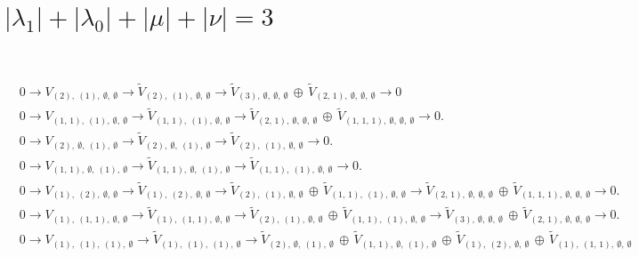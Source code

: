 \documentclass[openany, a4paper]{amsbook}
\theoremstyle{definition}
\numberwithin{equation}{chapter}
\begin{document}
$\quad$

\section{$ |\lambda_1| + |\lambda_0| + |\mu| + |\nu| = 3$}

$\quad$

\begin{align*} &
0 \to 
V_{ (2), \ (1), \ \emptyset, \ \emptyset }\to
\tilde{V}_{ (2), \ (1), \ \emptyset, \ \emptyset }
\to
\tilde{V}_{ (3), \ \emptyset, \ \emptyset, \ \emptyset }\,\oplus\,\tilde{V}_{ (2,\,1), \ \emptyset, \ \emptyset, \ \emptyset }
\to 0\\
&
0 \to 
V_{ (1,\,1), \ (1), \ \emptyset, \ \emptyset }\to
\tilde{V}_{ (1,\,1), \ (1), \ \emptyset, \ \emptyset }
\to
\tilde{V}_{ (2,\,1), \ \emptyset, \ \emptyset, \ \emptyset }\,\oplus\,\tilde{V}_{ (1,\,1,\,1), \ \emptyset, \ \emptyset, \ \emptyset }
\to 0.
\\ &
0 \to 
V_{ (2), \ \emptyset, \ (1), \ \emptyset }\to
\tilde{V}_{ (2), \ \emptyset, \ (1), \ \emptyset }
\to
\tilde{V}_{ (2), \ (1), \ \emptyset, \ \emptyset }
\to 0.
\\ &
0 \to 
V_{ (1,\,1), \ \emptyset, \ (1), \ \emptyset }\to
\tilde{V}_{ (1,\,1), \ \emptyset, \ (1), \ \emptyset }
\to
\tilde{V}_{ (1,\,1), \ (1), \ \emptyset, \ \emptyset }
\to 0.
\\ &
0 \to 
V_{ (1), \ (2), \ \emptyset, \ \emptyset }\to
\tilde{V}_{ (1), \ (2), \ \emptyset, \ \emptyset }
\to
\tilde{V}_{ (2), \ (1), \ \emptyset, \ \emptyset }\,\oplus\,\tilde{V}_{ (1,\,1), \ (1), \ \emptyset, \ \emptyset }
\to
\tilde{V}_{ (2,\,1), \ \emptyset, \ \emptyset, \ \emptyset }\,\oplus\,\tilde{V}_{ (1,\,1,\,1), \ \emptyset, \ \emptyset, \ \emptyset }
\to 0.
\\ &
0 \to 
V_{ (1), \ (1,\,1), \ \emptyset, \ \emptyset }\to
\tilde{V}_{ (1), \ (1,\,1), \ \emptyset, \ \emptyset }
\to
\tilde{V}_{ (2), \ (1), \ \emptyset, \ \emptyset }\,\oplus\,\tilde{V}_{ (1,\,1), \ (1), \ \emptyset, \ \emptyset }
\to
\tilde{V}_{ (3), \ \emptyset, \ \emptyset, \ \emptyset }\,\oplus\,\tilde{V}_{ (2,\,1), \ \emptyset, \ \emptyset, \ \emptyset }
\to 0.
\\ &
0 \to 
V_{ (1), \ (1), \ (1), \ \emptyset }\to
\tilde{V}_{ (1), \ (1), \ (1), \ \emptyset }
\to
\tilde{V}_{ (2), \ \emptyset, \ (1), \ \emptyset }\,\oplus\,\tilde{V}_{ (1,\,1), \ \emptyset, \ (1), \ \emptyset }\,\oplus\,\tilde{V}_{ (1), \ (2), \ \emptyset, \ \emptyset }\,\oplus\,\tilde{V}_{ (1), \ (1,\,1), \ \emptyset, \ \emptyset } \\ &

\end{align*}
\end{document}
